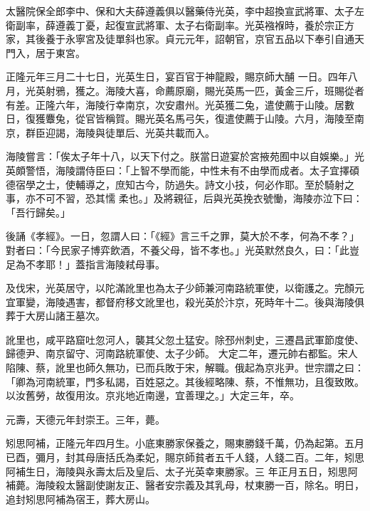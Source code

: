 \begin{pinyinscope}
 太醫院保全郎李中、保和大夫薛遵義俱以醫藥侍光英，李中超換宣武將軍、太子左衛副率，薛遵義丁憂，起復宣武將軍、太子右衛副率。光英襁褓時，養於宗正方家，其後養于永寧宮及徒單斜也家。貞元元年，詔朝官，京官五品以下奉引自通天門入，居于東宮。



 正隆元年三月二十七日，光英生日，宴百官于神龍殿，賜京師大酺
 一日。四年八月，光英射鴉，獲之。海陵大喜，命薦原廟，賜光英馬一匹，黃金三斤，班賜從者有差。正隆六年，海陵行幸南京，次安肅州。光英獲二兔，遣使薦于山陵。居數日，復獲麞兔，從官皆稱賀。賜光英名馬弓矢，復遣使薦于山陵。六月，海陵至南京，群臣迎謁，海陵與徒單后、光英共載而入。



 海陵嘗言：「俟太子年十八，以天下付之。朕當日遊宴於宮掖苑囿中以自娛樂。」光英頗警悟，海陵謂侍臣曰：「上智不學而能，中性未有不由學而成者。太子宜擇碩德宿學之士，使輔導之，庶知古今，防過失。詩文小技，何必作耶。至於騎射之事，亦不可不習，恐其懦
 柔也。」及將親征，后與光英挽衣號慟，海陵亦泣下曰：「吾行歸矣。」



 後誦《孝經》。一日，忽謂人曰：「《經》言三千之罪，莫大於不孝，何為不孝？」對者曰：「今民家子博弈飲酒，不養父母，皆不孝也。」光英默然良久，曰：「此豈足為不孝耶！」蓋指言海陵弒母事。



 及伐宋，光英居守，以陀滿訛里也為太子少師兼河南路統軍使，以衛護之。完顏元宜軍變，海陵遇害，都督府移文訛里也，殺光英於汴京，死時年十二。後與海陵俱葬于大房山諸王墓次。



 訛里也，咸平路窟吐忽河人，襲其父忽土猛安。除邳州刺史，三遷昌武軍節度使、歸德尹、南京留守、河南路統軍使、太子少師。
 大定二年，遷元帥右都監。宋人陷陳、蔡，訛里也師久無功，已而兵敗于宋，解職。俄起為京兆尹。世宗謂之曰：「卿為河南統軍，門多私謁，百姓惡之。其後經略陳、蔡，不惟無功，且復致敗。以汝舊勞，故復用汝。京兆地近南邊，宜善理之。」大定三年，卒。



 元壽，天德元年封崇王。三年，薨。



 矧思阿補，正隆元年四月生。小底東勝家保養之，賜東勝錢千萬，仍為起第。五月已酉，彌月，封其母唐括氏為柔妃，賜京師貧者五千人錢，人錢二百。二年，矧思阿補生日，海陵與永壽太后及皇后、太子光英幸東勝家。三
 年正月五日，矧思阿補薨。海陵殺太醫副使謝友正、醫者安宗義及其乳母，杖東勝一百，除名。明日，追封矧思阿補為宿王，葬大房山。




\end{pinyinscope}
